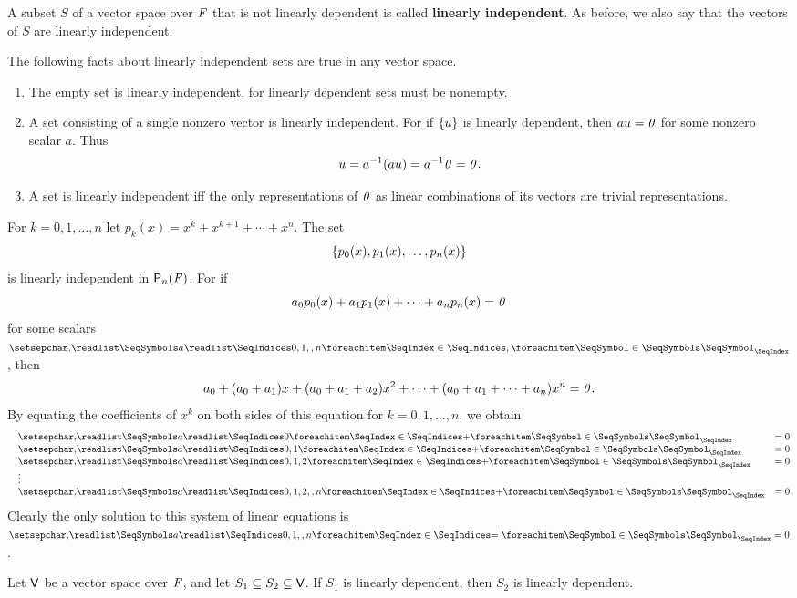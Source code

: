 \begin{defn}\label{1.5.3}
  A subset \(S\) of a vector space over \(\mathit{F}\) that is not linearly dependent is called \textbf{linearly independent}.
  As before, we also say that the vectors of \(S\) are linearly independent.
\end{defn}

\begin{eg}\label{1.5.4}
  The following facts about linearly independent sets are true in any vector space.
  \begin{enumerate}
    \item The empty set is linearly independent, for linearly dependent sets must be nonempty.
    \item A set consisting of a single nonzero vector is linearly independent.
          For if \(\left\lbrace u\right\rbrace\) is linearly dependent, then \(au = \mathit{0}\) for some nonzero scalar \(a\).
          Thus
          \[
            u = a^{-1} (au) = a^{-1} \mathit{0} = \mathit{0}.
          \]
    \item A set is linearly independent iff the only representations of \(\mathit{0}\) as linear combinations of its vectors are trivial representations.
  \end{enumerate}
\end{eg}

\begin{eg}\label{1.5.5}
  For \(k = 0, 1, \dots, n\) let \(p_k(x) = x^k + x^{k + 1} + \cdots + x^n\).
  The set
  \[
    \left\lbrace p_0(x), p_1(x), \dots, p_n(x)\right\rbrace
  \]
  is linearly independent in \(\ps[n]{\F}\).
  For if
  \[
    a_0 p_0(x) + a_1 p_1(x) + \cdots + a_n p_n(x) = \mathit{0}
  \]
  for some scalars \(\seq{a}{0,1,,n}\), then
  \[
    a_0 + (a_0 + a_1) x + (a_0 + a_1 + a_2) x^2 + \cdots + (a_0 + a_1 + \cdots + a_n) x^n = \mathit{0}.
  \]
  By equating the coefficients of \(x^k\) on both sides of this equation for \(k = 0, 1, \dots, n\), we obtain
  \[
    \begin{matrix*}[l]
      & \seq[+]{a}{0}      & = 0 \\
      & \seq[+]{a}{0,1}    & = 0 \\
      & \seq[+]{a}{0,1,2}  & = 0 \\
      & \vdots & \\
      & \seq[+]{a}{0,1,2,,n} & = 0
    \end{matrix*}
  \]
  Clearly the only solution to this system of linear equations is \(\seq[=]{a}{0,1,,n} = 0\).
\end{eg}

\begin{thm}\label{1.6}
  Let \(\mathsf{V}\) be a vector space over \(\mathit{F}\), and let \(S_1 \subseteq S_2 \subseteq \mathsf{V}\).
  If \(S_1\) is linearly dependent, then \(S_2\) is linearly dependent.
\end{thm}

